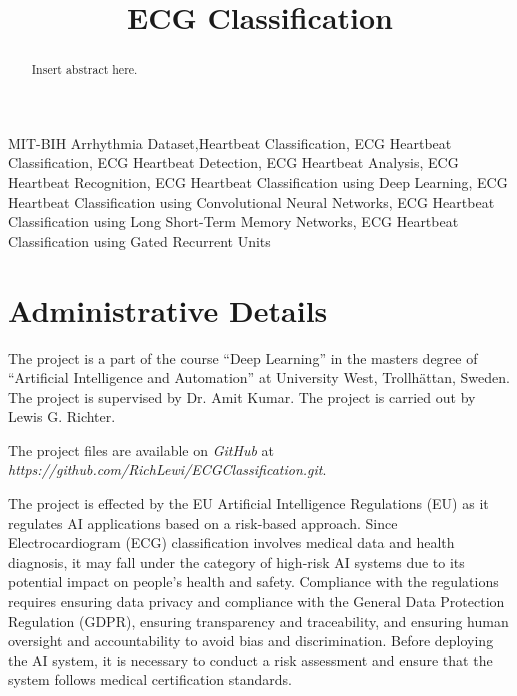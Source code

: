 \documentclass[conference]{IEEEtran}
\begin{document}
\title{ECG Classification}
\author{}

\maketitle

\begin{abstract}
Insert abstract here.
\end{abstract}

\begin{IEEEkeywords}
MIT-BIH Arrhythmia Dataset,Heartbeat Classification, ECG Heartbeat Classification, ECG Heartbeat Detection, ECG Heartbeat Analysis, ECG Heartbeat Recognition, ECG Heartbeat Classification using Deep Learning, ECG Heartbeat Classification using Convolutional Neural Networks, ECG Heartbeat Classification using Long Short-Term Memory Networks, ECG Heartbeat Classification using Gated Recurrent Units
\end{IEEEkeywords}

\section{Administrative Details}
The project is a part of the course ``Deep Learning'' in the masters degree of ``Artificial Intelligence and Automation'' at University West, Trollhättan, Sweden. The project is supervised by Dr. Amit Kumar. The project is carried out by Lewis G. Richter.

The project files are available on \textit{GitHub} at \textit{https://github.com/RichLewi/ECGClassification.git}.

The project is effected by the EU Artificial Intelligence Regulations (EU) \cite{b2} as it regulates AI applications based on a risk-based approach. Since Electrocardiogram (ECG) classification involves medical data and health diagnosis, it may fall under the category of high-risk AI systems due to its potential impact on people's health and safety. Compliance with the regulations requires ensuring data privacy and compliance with the General Data Protection Regulation (GDPR), ensuring transparency and traceability, and ensuring human oversight and accountability to avoid bias and discrimination. Before deploying the AI system, it is necessary to conduct a risk assessment and ensure that the system follows medical certification standards. 
\end{document}
